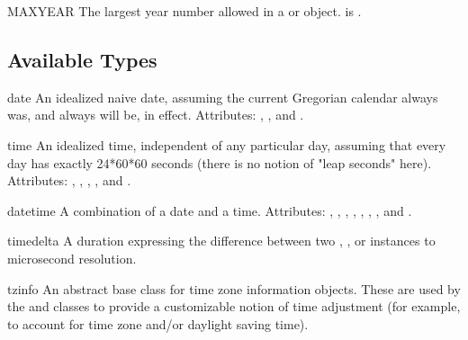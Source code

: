 \begin{datadesc}{MAXYEAR}
  The largest year number allowed in a  or 
  object.   is .
\end{datadesc}

\begin{seealso}
\end{seealso}

\subsection{Available Types}

\begin{classdesc*}{date}
  An idealized naive date, assuming the current Gregorian calendar
  always was, and always will be, in effect.
  Attributes: , , and .
\end{classdesc*}

\begin{classdesc*}{time}
  An idealized time, independent of any particular day, assuming
  that every day has exactly 24*60*60 seconds (there is no notion
  of "leap seconds" here).
  Attributes: , , ,
              , and .
\end{classdesc*}

\begin{classdesc*}{datetime}
  A combination of a date and a time.
  Attributes: , , ,
              , , ,
              , and .
\end{classdesc*}

\begin{classdesc*}{timedelta}
  A duration expressing the difference between two ,
  , or  instances to microsecond
  resolution.
\end{classdesc*}

\begin{classdesc*}{tzinfo}
  An abstract base class for time zone information objects.  These
  are used by the   and  classes to
  provide a customizable notion of time adjustment (for example, to
  account for time zone and/or daylight saving time).
\end{classdesc*}

